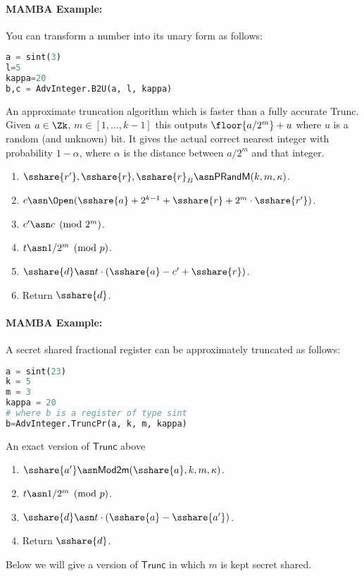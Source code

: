 \paragraph{MAMBA Example:} You can transform a number into its unary form as follows:
\begin{lstlisting}[language={python}]
a = sint(3)
l=5
kappa=20
b,c = AdvInteger.B2U(a, l, kappa)
\end{lstlisting}


An approximate truncation algorithm which is faster than
a fully accurate Trunc.
Given $a \in \Zk$, $m \in [1,\ldots,k-1]$
this outputs $\floor{a/2^m}+u$ where $u$ is a random
(and unknown) bit.
It gives the actual correct nearest integer with
probability $1-\alpha$, where $\alpha$ is the distance
between $a/2^m$ and that integer.
\begin{enumerate}
\item $\sshare{r'}, \sshare{r}, \sshare{r}_B \asn \mathsf{PRandM}(k,m,\kappa)$.
\item $c \asn \Open(\sshare{a}+2^{k-1}+\sshare{r}+2^m \cdot \sshare{r'})$.
\item $c'\asn c \pmod{2^m}$.
\item $t \asn 1/2^m \pmod{p}$.
\item $\sshare{d} \asn t \cdot (\sshare{a}-c'+\sshare{r})$.
\item Return $\sshare{d}$.
\end{enumerate}
\paragraph{MAMBA Example:} A secret shared fractional register can be approximately truncated as follows:
\begin{lstlisting}[language={python}]
a = sint(23)
k = 5
m = 3
kappa = 20
# where b is a register of type sint
b=AdvInteger.TruncPr(a, k, m, kappa)
\end{lstlisting}

An exact version of $\mathsf{Trunc}$ above
\begin{enumerate}
\item $\sshare{a'} \asn \mathsf{Mod2m}(\sshare{a},k,m, \kappa)$.
\item $t \asn 1/2^m \pmod{p}$.
\item $\sshare{d} \asn t \cdot (\sshare{a}-\sshare{a'})$.
\item Return $\sshare{d}$.
\end{enumerate}
Below we will give a version of $\mathsf{Trunc}$ in which $m$ is kept secret shared.

